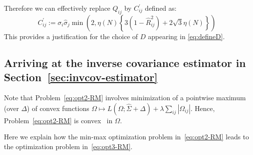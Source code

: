 Therefore we can effectively replace $Q_{ij}$ by $C^{'}_{ij}$ defined as:
\begin{equation}\label{eq:defineCtilde}
C^{'}_{ij} := \hat{\sigma}_{i} \hat{\sigma}_{j} \min \left (2,  \eta (N) \left \{ 3 (1 - \hat{R}^2_{ij}) + 2 \sqrt{3} \eta (N) \right \} \right )
\end{equation}
This provides a justification for the choice of $D$ appearing in \eqref{eq:defineD}.

\subsection*{Arriving at the \Robocov{} inverse covariance estimator in Section~\ref{sec:invcov-estimator}}

Note that Problem~\eqref{eq:opt2-RM} involves minimization of a pointwise maximum (over $\Delta$) of convex functions $\Omega \mapsto L(\Omega; \hat{\Sigma} + \Delta) + \lambda \sum_{ij} |\Omega_{ij}|$. 
Hence, Problem~\eqref{eq:opt2-RM} is convex~\cite{BV2004} in $\Omega$.

Here we explain how the min-max optimization problem in~\eqref{eq:opt2-RM} leads to the optimization problem in~\eqref{eq:opt3-RM}. 




